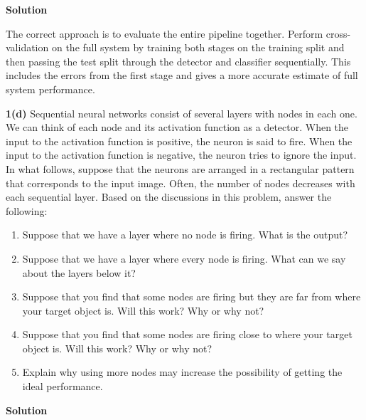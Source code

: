 \documentclass[11pt]{article}
\begin{document}
	\textbf{Solution}
	
	The correct approach is to evaluate the entire pipeline together. Perform cross-validation on the full system by training both stages on the training split and then passing the test split through the detector and classifier sequentially. This includes the errors from the first stage and gives a more accurate estimate of full system performance.
	
	\textbf{1(d)} Sequential neural networks consist of several layers with nodes in each one. We can think of each node and its
	activation function as a detector. When the input to the activation function is positive, the neuron is said to fire.
	When the input to the activation function is negative, the neuron tries to ignore the input. In what follows, suppose
	that the neurons are arranged in a rectangular pattern that corresponds to the input image.
	Often, the number of nodes decreases with each sequential layer. Based on the discussions in this problem, answer
	the following:
	
	\begin{enumerate}[label=\roman*.]
		\item Suppose that we have a layer where no node is firing. What is the output?
		\item Suppose that we have a layer where every node is firing. What can we say about the layers below it?
		\item Suppose that you find that some nodes are firing but they are far from where your target object is. Will this
		work? Why or why not?
		\item Suppose that you find that some nodes are firing close to where your target object is. Will this work? Why or
		why not?
		\item Explain why using more nodes may increase the possibility of getting the ideal performance.
	\end{enumerate}
	
	\textbf{Solution}
	
\end{document}
